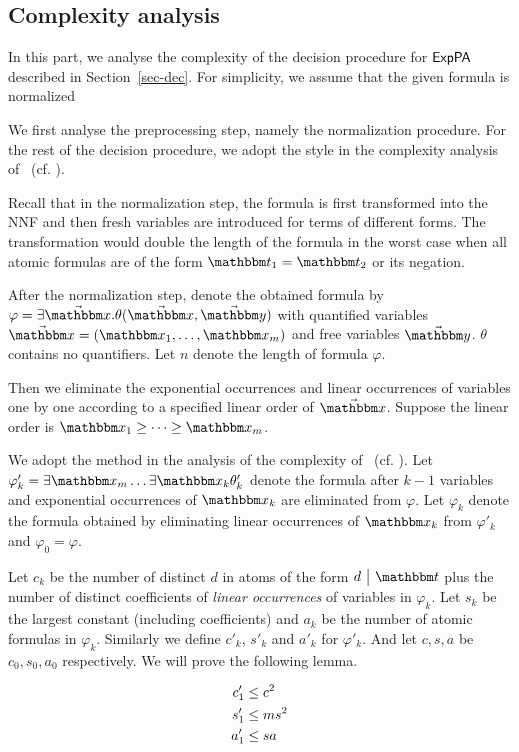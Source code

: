 \subsection{Complexity analysis}\label{app:cpx}

In this part, we analyse the complexity of the decision procedure for ${\sf ExpPA}$ described in Section~\ref{sec-dec}. For simplicity, we assume that the given formula is normalized

We first analyse the preprocessing step, namely the normalization procedure. For the rest of the decision procedure, we adopt the style in the complexity analysis of \pa \ (cf. \cite{Oppen73}).

Recall that in the normalization step, the formula is first transformed into the NNF and then fresh variables are introduced for terms of different forms. The transformation would double the length of the formula in the worst case when all atomic formulas are of the form $\iterm_1 = \iterm_2$ or its negation. 

After the normalization step, denote the obtained formula by $\varphi = \exists \vec{\ivarx}. \theta(\vec{\ivarx},\vec{\ivary})$ with quantified variables $\vec{\ivarx} = (\ivarx_1,\dots,\ivarx_m)$ and free variables $\vec{\ivary}$. $\theta$ contains no quantifiers. 
Let $n$ denote the length of formula $\varphi$.

Then we eliminate the exponential occurrences and linear occurrences of variables one by one according to a specified linear order of $\vec{\ivarx}$. Suppose the linear order is $\ivarx_1\ge \dots \ge \ivarx_m$.

We adopt the method in the analysis of the complexity of \pa \ (cf. \cite{Oppen73}).  Let $\varphi'_k = \exists \ivarx_m \dots  \exists \ivarx_{k}\theta'_k$ denote the formula after $k-1$ variables and exponential occurrences of $\ivarx_k$ are eliminated from $\varphi$. Let $\varphi_k$ denote the formula obtained by eliminating linear occurrences of $\ivarx_k$ from $\varphi'_k$ and $\varphi_0=\varphi$.


Let $c_k$ be the number of distinct $d$ in atoms of the form $d \ \big | \ \iterm$ plus the number of distinct coefficients of \emph{linear occurrences} of variables in $\varphi_k$. Let $s_k$ be the largest constant (including coefficients) and $a_k$ be the number of atomic formulas in $\varphi_k$. Similarly we define $c'_k$, $s'_k$ and $a'_k$ for $\varphi'_k$. And let $c,s,a$ be $c_0,s_0,a_0$ respectively. We will prove the following lemma.
\begin{lemma}\label{lem:cpx exp}
    \begin{align}
        c'_1&\le c^2 \notag \\
        s'_1&\le ms^2 \notag\\
        a'_1&\le sa\notag 
    \end{align} 
\end{lemma}

